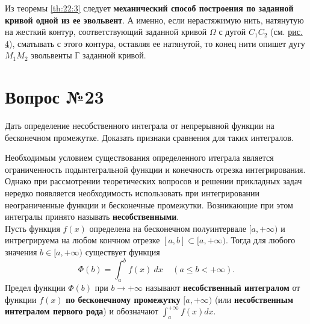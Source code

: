 \documentclass[12pt]{report}
\numberwithin{equation}{section}
\begin{document}
Из теоремы \ref{th:22:3} следует \textbf{механический способ построения по заданной кривой одной из ее эвольвент}. А именно, если нерастяжимую нить, натянутую на жесткий контур, соответствующий заданной кривой $\Omega$ с дугой $C_1 C_2$ (см. \hyperref[pic:22:2]{рис. 4}), сматывать с этого контура, оставляя ее натянутой, то конец нити опишет дугу $M_1 M_2$ эвольвенты Г заданной кривой.

\newpage \section{Вопрос №23} %
\begin{framed}
Дать определение несобственного интеграла от непрерывной функции на бесконечном промежутке. Доказать признаки сравнения для таких интегралов.
\end{framed}

Необходимым условием существования определенного итеграла является ограниченность подынтегральной функции и конечность отрезка интегрирования. Однако при рассмотрении теоретических вопросов и решении прикладных задач нередко появляется необходимость использовать при интегрировании неограниченные функции и бесконечные промежутки. Возникающие при этом интегралы принято называть \textbf{несобственными}.\\

Пусть функция $f(x)$ определена на бесконечном полуинтервале $[a, +\infty)$ и интрегрируема на любом кончном отрезке $[a,b] \subset [a, + \infty)$. Тогда для любого значения $b \in [a, + \infty)$ существует функция
\[ \Phi(b) = \int_a^b f(x)~dx~~~~~(a \leqslant b < + \infty).\]
Предел функции $\Phi(b)$ при $b \to + \infty$ называют \textbf{несобственный интегралом} от функции $f(x)$ \textbf{по бесконечному промежутку} $[a, + \infty)$ (или \textbf{несобственным интегралом первого рода}) и обозначают $\int_a^{+ \infty} f(x)dx$.
\end{document}

